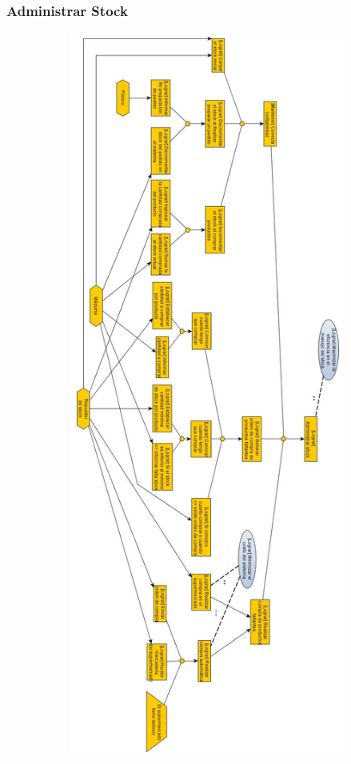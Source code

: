 \documentclass[a4paper,11pt] {article}
\begin{document}
\subsubsection*{Administrar Stock}
\begin{center}
 \includegraphics[height=24cm,width=17cm]{Diagramas/AdministrarStock.jpg}
\end{center}
\end{document}
